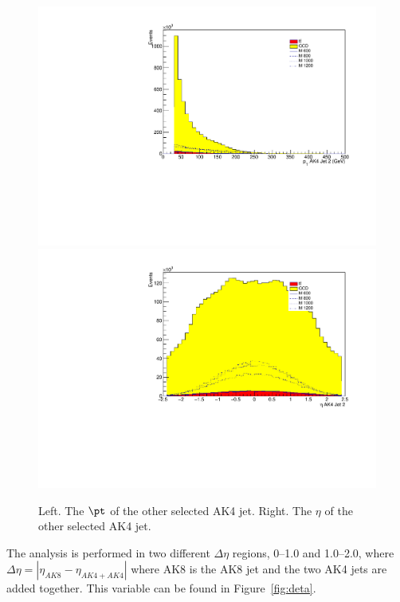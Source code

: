 \begin{figure}[thb!]
\begin{center}
\includegraphics[scale=0.34]{F5/shapeptJ2.pdf}
\includegraphics[scale=0.34]{F5/shapeetaJ2.pdf}\\
\end{center}
\caption{Left. The $\pt$ of the other selected AK4 jet. Right. The $\eta$ of the other selected AK4 jet.}
\label{fig:AK42pteta}
\end{figure} 

The analysis is performed in two different $\Delta\eta$ regions, 0--1.0 and 1.0--2.0, where $\Delta\eta = |\eta_{AK8} - \eta_{AK4 + AK4}|$ where AK8 is the AK8 jet and the two AK4 jets are added together. This variable can be found in Figure~\ref{fig:deta}. 

